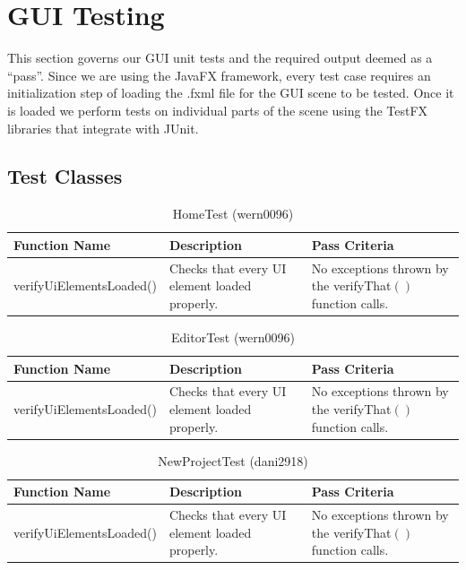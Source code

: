 \documentclass[14pt, a4paper]{article}
\begin{document}
\newpage

\section{GUI Testing}

This section governs our GUI unit tests and the required output deemed as a ``pass''. Since we are using the JavaFX framework, every test case requires an initialization step of loading the .fxml file for the GUI scene to be tested. Once it is loaded we perform tests on individual parts of the scene using the TestFX libraries that integrate with JUnit.

\subsection{Test Classes}

\begin{table}[h]
	\centering	
	\caption{HomeTest (wern0096)}
	\begin{tabular}{|p{4cm}|p{5cm}|p{6cm}|} 
		\hline
		\textbf{Function Name} & \textbf{Description} & \textbf{Pass Criteria}  \\\hline
		verifyUiElementsLoaded() & Checks that every UI element loaded properly. & No exceptions thrown by the verifyThat$\left(\right)$ function calls. \\\hline
	\end{tabular}
\end{table}

\begin{table}[h]
	\centering	
	\caption{EditorTest (wern0096)}
	\begin{tabular}{|p{4cm}|p{5cm}|p{6cm}|} 
		\hline
		\textbf{Function Name} & \textbf{Description} & \textbf{Pass Criteria}  \\\hline
		verifyUiElementsLoaded() & Checks that every UI element loaded properly. & No exceptions thrown by the verifyThat$\left(\right)$ function calls. \\\hline
	\end{tabular}
\end{table}

\begin{table}[h]
	\centering
	\caption{NewProjectTest (dani2918)}
	\begin{tabular}{|p{4cm}|p{5cm}|p{6cm}|}
		\hline
		\textbf{Function Name} & \textbf{Description} & \textbf{Pass Criteria}  \\\hline
		verifyUiElementsLoaded() & Checks that every UI element loaded properly. & No exceptions thrown by the verifyThat$\left(\right)$ function calls. \\\hline
	\end{tabular}
\end{table}
\end{document}

